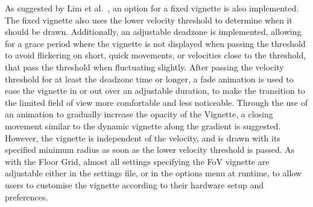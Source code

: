 As suggested by Lim et al.~\cite{Lim2020}, an option for a fixed vignette is also implemented.
The fixed vignette also uses the lower velocity threshold to determine when it should be drawn.
Additionally, an adjustable deadzone is implemented, allowing for a grace period where the vignette is not displayed
when passing the threshold to avoid flickering on short, quick movements, or velocities close to the threshold, that
pass the threshold when fluctuating slightly.
After passing the velocity threshold for at least the deadzone time or longer, a fade animation is used to ease the
vignette in or out over an adjustable duration, to make the transition to the limited field of view more comfortable and
less noticeable.
Through the use of an animation to gradually increase the opacity of the Vignette, a closing movement similar to the
dynamic vignette along the gradient is suggested.
However, the vignette is independent of the velocity, and is drawn with its specified minimum radius as soon as the
lower velocity threshold is passed.
As with the Floor Grid, almost all settings specifying the FoV vignette are adjustable either in the settings
file, or in the options menu at runtime, to allow users to customise the vignette according to their hardware setup
and preferences.


